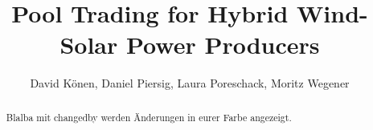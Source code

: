 \documentclass[11pt]{scrartcl}
\title{Pool Trading for Hybrid Wind-Solar Power Producers}
\author{David K\"onen, Daniel Piersig, Laura Poreschack, Moritz Wegener  }  %
\newcommand{\changedByDK}[1]{\textcolor{orange!50!black}{#1}}
\begin{document}
\maketitle

\begin{abstract}
  Blalba    \changedByDK{ mit changedby werden Änderungen in eurer Farbe angezeigt. } 
\end{abstract}

 
 
 
 



 
 

 
 

 







 
 
\end{document}
